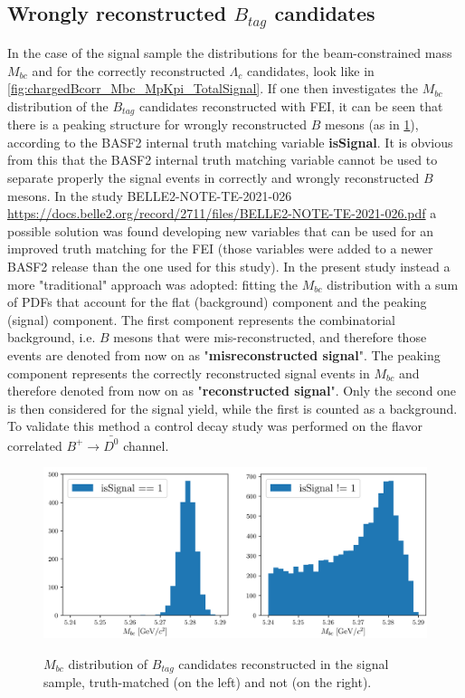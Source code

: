 \subsection{Wrongly reconstructed $B_{tag}$ candidates}\label{wronglyBtag}

In the case of the signal sample the distributions for the beam-constrained mass $M_{bc}$ and for the correctly reconstructed $\Lambda_c$ candidates, look
like in \cref{fig:chargedBcorr_Mbc_MpKpi_TotalSignal}. If one then investigates the $M_{bc}$ distribution of the $B_{tag}$ candidates reconstructed with 
FEI, it can be seen that there is a peaking structure for wrongly reconstructed $B$ 
mesons (as in \cref{fig:wrongly_recoB}), according to the BASF2 internal truth matching variable \textbf{isSignal}.
It is obvious from this that the BASF2 internal truth matching variable cannot be used to separate properly the signal events in correctly and wrongly reconstructed $B$ mesons. In the study  BELLE2-NOTE-TE-2021-026 \url{https://docs.belle2.org/record/2711/files/BELLE2-NOTE-TE-2021-026.pdf} a possible solution was found developing new variables that can be used for an improved truth matching for the FEI (those variables were added to a newer BASF2 release than the one used for this study). In the present study instead a more "traditional" approach was adopted: fitting the $M_{bc}$ distribution with a sum of PDFs that account for the flat (background) component and the peaking (signal) component. The first component represents the combinatorial background, i.e. $B$ mesons that were mis-reconstructed, and therefore those events are denoted from now on as    "\textbf{misreconstructed signal}".  
The peaking component represents the correctly reconstructed signal events in $M_{bc}$ and therefore denoted from now on as "\textbf{reconstructed signal}".  Only the second one is then considered for the signal yield, while the first is counted as a background.
To validate this method a control decay study was performed on the flavor correlated $B^+ \rightarrow \bar{D^0}$ channel. 


\begin{figure}[h!]
\centering
{\includegraphics[width=1.\textwidth]{03-Selection/figs/wrongly_recoB.png}}
\caption{$M_{bc}$ distribution of $B_{tag}$ candidates reconstructed in the signal sample, truth-matched (on the left) and not (on the right).}
\label{fig:wrongly_recoB}
\end{figure}




